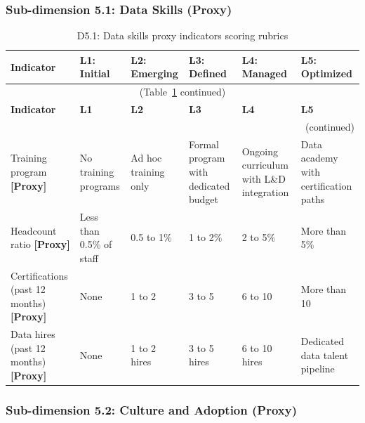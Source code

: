 \subsubsection*{Sub-dimension 5.1: Data Skills (Proxy)}

\begin{center}
{\small
\begin{longtable}{|p{2.4cm}|p{2.0cm}|p{2.0cm}|p{2.2cm}|p{2.2cm}|p{2.2cm}|}
\caption{D5.1: Data skills proxy indicators scoring rubrics} \label{tab:d5-1} \\
\hline
\textbf{Indicator} & \textbf{L1: Initial} & \textbf{L2: Emerging} & \textbf{L3: Defined} & \textbf{L4: Managed} & \textbf{L5: Optimized} \\
\hline
\endfirsthead
\multicolumn{6}{c}{\small (Table~\ref{tab:d5-1} continued)} \\
\hline
\textbf{Indicator} & \textbf{L1} & \textbf{L2} & \textbf{L3} & \textbf{L4} & \textbf{L5} \\
\hline
\endhead
\hline
\multicolumn{6}{r}{\small (continued)} \\
\endfoot
\hline
\endlastfoot
Training program \textbf{[Proxy]} &
  No training programs &
  Ad hoc training only &
  Formal program with dedicated budget &
  Ongoing curriculum with L\&D integration &
  Data academy with certification paths \\
\hline
Headcount ratio \textbf{[Proxy]} &
  Less than 0.5\% of staff &
  0.5 to 1\% &
  1 to 2\% &
  2 to 5\% &
  More than 5\% \\
\hline
Certifications (past 12 months) \textbf{[Proxy]} &
  None &
  1 to 2 &
  3 to 5 &
  6 to 10 &
  More than 10 \\
\hline
Data hires (past 12 months) \textbf{[Proxy]} &
  None &
  1 to 2 hires &
  3 to 5 hires &
  6 to 10 hires &
  Dedicated data talent pipeline \\
\hline
\end{longtable}
}
\end{center}

\subsubsection*{Sub-dimension 5.2: Culture and Adoption (Proxy)}

